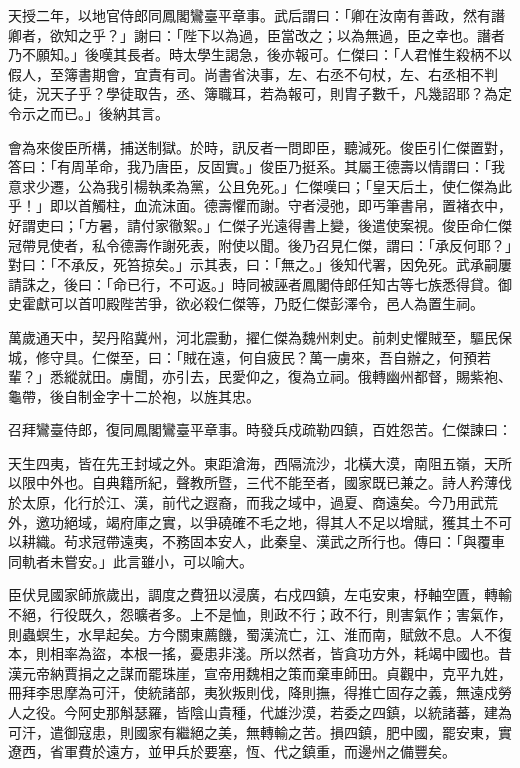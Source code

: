\begin{pinyinscope}
 天授二年，以地官侍郎同鳳閣鸞臺平章事。武后謂曰：「卿在汝南有善政，然有譖卿者，欲知之乎？」謝曰：「陛下以為過，臣當改之；以為無過，臣之幸也。譖者乃不願知。」後嘆其長者。時太學生謁急，後亦報可。仁傑曰：「人君惟生殺柄不以假人，至簿書期會，宜責有司。尚書省決事，左、右丞不句杖，左、右丞相不判徒，況天子乎？學徒取告，丞、簿職耳，若為報可，則胄子數千，凡幾詔耶？為定令示之而已。」後納其言。



 會為來俊臣所構，捕送制獄。於時，訊反者一問即臣，聽減死。俊臣引仁傑置對，答曰：「有周革命，我乃唐臣，反固實。」俊臣乃挺系。其屬王德壽以情謂曰：「我意求少遷，公為我引楊執柔為黨，公且免死。」仁傑嘆曰；「皇天后土，使仁傑為此乎！」即以首觸柱，血流沫面。德壽懼而謝。守者浸弛，即丐筆書帛，置褚衣中，好謂吏曰；「方暑，請付家徹絮。」仁傑子光遠得書上變，後遣使案視。俊臣命仁傑冠帶見使者，私令德壽作謝死表，附使以聞。後乃召見仁傑，謂曰：「承反何耶？」對曰：「不承反，死笞掠矣。」示其表，曰：「無之。」後知代署，因免死。武承嗣屢請誅之，後曰：「命已行，不可返。」時同被誣者鳳閣侍郎任知古等七族悉得貸。御史霍獻可以首叩殿陛苦爭，欲必殺仁傑等，乃貶仁傑彭澤令，邑人為置生祠。



 萬歲通天中，契丹陷冀州，河北震動，擢仁傑為魏州刺史。前刺史懼賊至，驅民保城，修守具。仁傑至，曰：「賊在遠，何自疲民？萬一虜來，吾自辦之，何預若輩？」悉縱就田。虜聞，亦引去，民愛仰之，復為立祠。俄轉幽州都督，賜紫袍、龜帶，後自制金字十二於袍，以旌其忠。



 召拜鸞臺侍郎，復同鳳閣鸞臺平章事。時發兵戍疏勒四鎮，百姓怨苦。仁傑諫曰：



 天生四夷，皆在先王封域之外。東距滄海，西隔流沙，北橫大漠，南阻五嶺，天所以限中外也。自典籍所紀，聲教所暨，三代不能至者，國家既已兼之。詩人矜薄伐於太原，化行於江、漢，前代之遐裔，而我之域中，過夏、商遠矣。今乃用武荒外，邀功絕域，竭府庫之實，以爭磽確不毛之地，得其人不足以增賦，獲其土不可以耕織。茍求冠帶遠夷，不務固本安人，此秦皇、漢武之所行也。傳曰：「與覆車同軌者未嘗安。」此言雖小，可以喻大。



 臣伏見國家師旅歲出，調度之費狃以浸廣，右戍四鎮，左屯安東，杼軸空匱，轉輸不絕，行役既久，怨曠者多。上不是恤，則政不行；政不行，則害氣作；害氣作，則蟲螟生，水旱起矣。方今關東薦饑，蜀漢流亡，江、淮而南，賦斂不息。人不復本，則相率為盜，本根一搖，憂患非淺。所以然者，皆貪功方外，耗竭中國也。昔漢元帝納賈捐之之謀而罷珠崖，宣帝用魏相之策而棄車師田。貞觀中，克平九姓，冊拜李思摩為可汗，使統諸部，夷狄叛則伐，降則撫，得推亡固存之義，無遠戍勞人之役。今阿史那斛瑟羅，皆陰山貴種，代雄沙漠，若委之四鎮，以統諸蕃，建為可汗，遣御寇患，則國家有繼絕之美，無轉輸之苦。損四鎮，肥中國，罷安東，實遼西，省軍費於遠方，並甲兵於要塞，恆、代之鎮重，而邊州之備豐矣。




\end{pinyinscope}
